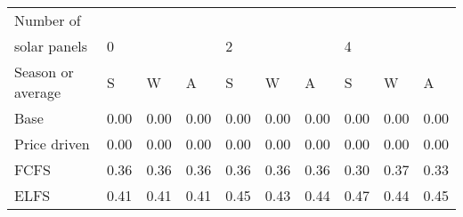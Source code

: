 \begin{table}[h] 
\centering 
\begin{tabular}{l|lll|lll|lll}Number of \\ solar panels&0& & &2& & &4& & \\ \hline 
Season or average & S & W & A & S & W & A & S & W & A \\ \hline 
Base&0.00&0.00&0.00&0.00&0.00&0.00&0.00&0.00&0.00 \\ 
Price driven&0.00&0.00&0.00&0.00&0.00&0.00&0.00&0.00&0.00 \\ 
FCFS&0.36&0.36&0.36&0.36&0.36&0.36&0.30&0.37&0.33 \\ 
ELFS&0.41&0.41&0.41&0.45&0.43&0.44&0.47&0.44&0.45 \\ 
\end{tabular} 
\end{table}